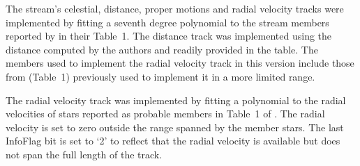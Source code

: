The stream's celestial, distance, proper motions and radial velocity tracks were implemented by fitting a seventh degree polynomial to the stream members reported by \citet{Ibata2021} in their Table~1. The distance track was implemented using the distance computed by the authors and readily provided in the table.  The members used to implement the radial velocity track in this version include those from \citet{Ibata2019} (Table~1) previously used to implement it in a more limited range.

The radial velocity track was implemented by fitting a polynomial to the radial velocities of stars reported as probable members in Table~1 of \citet{Ibata2019}. The radial velocity is set to zero outside the range spanned by the member stars. The last InfoFlag bit is set to `2' to reflect that the radial velocity is available but does not span the full length of the track.

